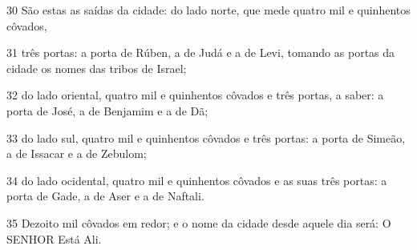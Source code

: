 \par 30 São estas as saídas da cidade: do lado norte, que mede quatro mil e quinhentos côvados,
\par 31 três portas: a porta de Rúben, a de Judá e a de Levi, tomando as portas da cidade os nomes das tribos de Israel;
\par 32 do lado oriental, quatro mil e quinhentos côvados e três portas, a saber: a porta de José, a de Benjamim e a de Dã;
\par 33 do lado sul, quatro mil e quinhentos côvados e três portas: a porta de Simeão, a de Issacar e a de Zebulom;
\par 34 do lado ocidental, quatro mil e quinhentos côvados e as suas três portas: a porta de Gade, a de Aser e a de Naftali.
\par 35 Dezoito mil côvados em redor; e o nome da cidade desde aquele dia será: O SENHOR Está Ali.


